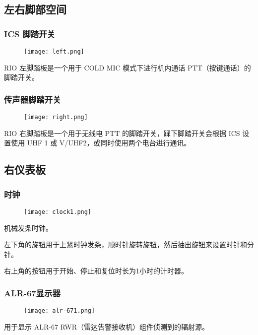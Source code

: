 \subsection{左右脚部空间}

\subsubsection{ICS 脚踏开关}
\begin{figure}[htb]
	\centering
	\texttt{[image: left.png]}
\end{figure}
RIO 左脚踏板是一个用于 COLD MIC 模式下进行机内通话 PTT（按键通话）的脚踏开关。

\subsubsection{传声器脚踏开关}
\begin{figure}[htb]
	\centering
	\texttt{[image: right.png]}
\end{figure}
RIO 右脚踏板是一个用于无线电 PTT 的脚踏开关，踩下脚踏开关会根据 ICS 设置使用 UHF 1 或 V/UHF2，或同时使用两个电台进行通讯。

\subsection{右仪表板}

\subsubsection{时钟}
\begin{figure}[htb]
	\centering
	\texttt{[image: clock1.png]}
\end{figure}
机械发条时钟。

左下角的旋钮用于上紧时钟发条，顺时针旋转旋钮，然后抽出旋钮来设置时针和分针。

右上角的按钮用于开始、停止和复位时长为1小时的计时器。

\subsubsection{ALR-67显示器}
\begin{figure}[htb]
	\centering
	\texttt{[image: alr-671.png]}
\end{figure}
用于显示 ALR-67 RWR（雷达告警接收机）组件侦测到的辐射源。

